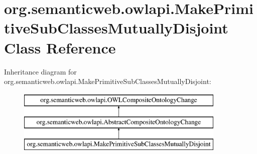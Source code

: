 \hypertarget{classorg_1_1semanticweb_1_1owlapi_1_1_make_primitive_sub_classes_mutually_disjoint}{\section{org.\-semanticweb.\-owlapi.\-Make\-Primitive\-Sub\-Classes\-Mutually\-Disjoint Class Reference}
\label{classorg_1_1semanticweb_1_1owlapi_1_1_make_primitive_sub_classes_mutually_disjoint}
}
Inheritance diagram for org.\-semanticweb.\-owlapi.\-Make\-Primitive\-Sub\-Classes\-Mutually\-Disjoint\-:\begin{figure}[H]
\begin{center}
\leavevmode
\includegraphics[height=3.000000cm]{classorg_1_1semanticweb_1_1owlapi_1_1_make_primitive_sub_classes_mutually_disjoint}
\end{center}
\end{figure}
